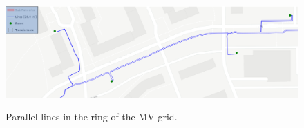 \begin{figure}[h]
	\begin{centering}
		{\includegraphics[scale=0.5]{figures/experiments/enwg_zoom.png}}
		\caption[Example graph zoom]{Parallel lines in the ring of the MV grid.}
		\label{fig:enwg_zoom}
	\end{centering}
\end{figure}
